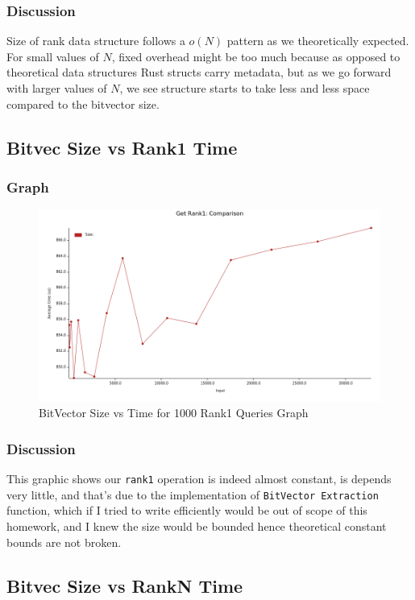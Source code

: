 \documentclass{report}
\begin{document}
\subsubsection*{Discussion}
Size of rank data structure follows a $o(N)$ pattern as we theoretically expected. For small values of $N$, fixed overhead might be too much because as opposed to theoretical data structures Rust structs carry metadata, but as we go forward with larger values of $N$, we see structure starts to take less and less space compared to the bitvector size.
\newpage

\subsection*{Bitvec Size vs Rank1 Time}
\subsubsection*{Graph}
\begin{figure}[h!]
    \centering
    \includegraphics[scale=0.5]{get_rank1_time.png}
    \caption{BitVector Size vs Time for 1000 Rank1 Queries Graph}
    \label{fig:my_label}
\end{figure}
\subsubsection*{Discussion}
This graphic shows our \texttt{rank1} operation is indeed almost constant, is depends very little, and that's due to the implementation of \texttt{BitVector Extraction} function, which if I tried to write efficiently would be out of scope of this homework, and I knew the size would be bounded hence theoretical constant bounds are not broken.
\newpage

\subsection*{Bitvec Size vs RankN Time}
\end{document}
